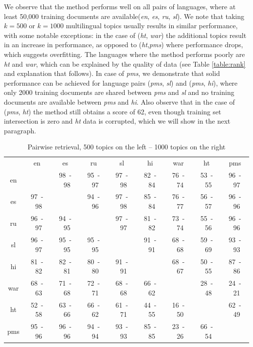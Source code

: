\documentclass[twoside,11pt]{article}
\begin{document}
We observe that the method performs well on all pairs of languages, where at least 50,000 training documents are available(\emph{en}, \emph{es}, \emph{ru}, \emph{sl}). We note that taking $k = 500$ or $k = 1000$ multilingual topics usually results in similar performance, with some notable exceptions: in the case of (\emph{ht}, \emph{war}) the additional topics result in an increase in performance, as opposed to (\emph{ht},\emph{pms}) where performance drops, which suggests overfitting. The languages where the method performs poorly are \emph{ht} and \emph{war}, which can be explained by the quality of data (see Table \ref{table:rank} and explanation that follows). In case of \emph{pms}, we demonstrate that solid performance can be achieved for language pairs (\emph{pms}, \emph{sl}) and (\emph{pms}, \emph{hi}), where only 2000 training documents are shared between \emph{pms} and \emph{sl} and no training documents are available between \emph{pms} and \emph{hi}. Also observe that in the case of (\emph{pms}, \emph{ht}) the method still obtains a score of 62, even though training set intersection is zero and \emph{ht} data is corrupted, which we will show in the next paragraph.
{
\renewcommand\tabcolsep{3pt}
\begin{table}[h!]
\caption{Pairwise retrieval, 500 topics on the left -- 1000 topics on the right}\label{table:retrieval}
\begin{center}
\begin{tabular}{|c|c|c|c|c|c|c|c|c|}
\cline{1-9}
&	en&	es&	ru&	sl&	hi&	war&	ht&	pms\\\cline{1-9}
en&	    &	98~-~98&	95~-~97&	97~-~98&	82~-~84&	76~-~74&	53~-~55&	 96~-~97\\
\cline{1-9}
es&	97~-~98&	&	94~-~96&	97~-~98&	85~-~84&	76~-~77&	56~-~57&	96~-~96\\
\cline{1-9}
ru&	96~-~97&	94~-~95&	&	97~-~97&	81~-~82&	73~-~74&	55~-~56&	96~-~96\\
\cline{1-9}
sl&	96~-~97&	95~-~95&	95~-~95&	&	91~-~91&	68~-~68&	59~-~69&	93~-~93\\
\cline{1-9}
hi&	81~-~82&	82~-~81&	80~-~80&	91~-~91&	&	68~-~67&	50~-~55&	87~-~86\\
\cline{1-9}
war&	68~-~63&	71~-~68&	72~-~71&	68~-~68&	66~-~62&	&	28~-~48&	 24~-~21\\
\cline{1-9}
ht&	52~-~58&	63~-~66&	66~-~62&	61~-~71&	44~-~55&	16~-~50&	&	62~-~49\\
\cline{1-9}
pms&	95~-~96&	96~-~96&	94~-~94&	93~-~93&	85~-~85&	23~-~26&	66~-~54&	 \\
\cline{1-9}
\end{tabular}
\end{center}
\end{table}
}
\end{document}
